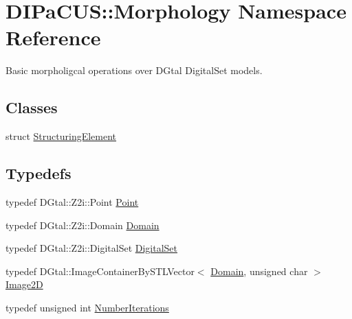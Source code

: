 \hypertarget{namespaceDIPaCUS_1_1Morphology}{}\section{D\+I\+Pa\+C\+US\+:\+:Morphology Namespace Reference}
\label{namespaceDIPaCUS_1_1Morphology}


Basic morpholigcal operations over D\+Gtal Digital\+Set models.  


\subsection*{Classes}
\begin{DoxyCompactItemize}
\item 
struct \hyperlink{structDIPaCUS_1_1Morphology_1_1StructuringElement}{Structuring\+Element}
\end{DoxyCompactItemize}
\subsection*{Typedefs}
\begin{DoxyCompactItemize}
\item 
typedef D\+Gtal\+::\+Z2i\+::\+Point \hyperlink{namespaceDIPaCUS_1_1Morphology_a1b95c2849cc5d6b0852b34aa4496f3cd}{Point}
\item 
typedef D\+Gtal\+::\+Z2i\+::\+Domain \hyperlink{namespaceDIPaCUS_1_1Morphology_ab9f5fc1118b80b969855f77bee7d9914}{Domain}
\item 
typedef D\+Gtal\+::\+Z2i\+::\+Digital\+Set \hyperlink{namespaceDIPaCUS_1_1Morphology_ab69fa725716b0ed4c311c0d00a292be7}{Digital\+Set}
\item 
typedef D\+Gtal\+::\+Image\+Container\+By\+S\+T\+L\+Vector$<$ \hyperlink{namespaceDIPaCUS_1_1Morphology_ab9f5fc1118b80b969855f77bee7d9914}{Domain}, unsigned char $>$ \hyperlink{namespaceDIPaCUS_1_1Morphology_a9aff9edf28d681accfc54435fbefcbee}{Image2D}
\item 
typedef unsigned int \hyperlink{namespaceDIPaCUS_1_1Morphology_a8ffa7d1c2023be8b21bc87a4b7df7cca}{Number\+Iterations}
\end{DoxyCompactItemize}
